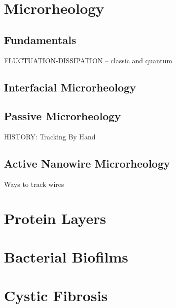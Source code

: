 \section{Microrheology}
\subsection{Fundamentals}

FLUCTUATION-DISSIPATION -- classic and quantum

\subsection{Interfacial Microrheology}

\subsection{Passive Microrheology}
HISTORY: Tracking By Hand


\subsection{Active Nanowire Microrheology}

Ways to track wires

\section{Protein Layers}
\section{Bacterial Biofilms}
\section{Cystic Fibrosis}
